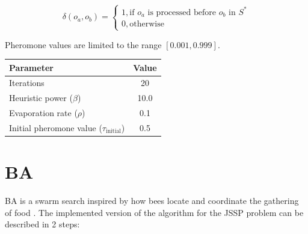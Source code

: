 \documentclass[paper=a4, fontsize=9pt]{scrartcl}
\begin{document}
\begin{multicols}{2}
\begin{equation}
\delta(o_a, o_b) =
\begin{cases}
1, \text{if $o_a$ is processed before $o_b$ in $S^{*}$}\\
0, \text{otherwise}
\end{cases}
\label{eq:acodelta}
\end{equation}

Pheromone values are limited to the range $[0.001, 0.999]$.

{
\vspace{0.2cm}
\begin{minipage}{\linewidth{}}
\centering
\begin{tabular}{lc}
\toprule
Parameter                                         & Value \\
\midrule
Iterations                                        & 20    \\
Heuristic power ($\beta$)                         & 10.0  \\
Evaporation rate ($\rho$)                         &  0.1  \\
Initial pheromone value ($\tau_{\text{initial}}$) &  0.5  \\
\bottomrule
\end{tabular}
\vspace{-0.2cm}
\label{table:acoparams}
\end{minipage}
}

\section*{\acl{BA}}

\acf{BA} is a swarm search inspired by how bees locate and coordinate the gathering of food \cite{pham2011bees}. The implemented version of the algorithm for the \ac{JSSP} problem can be described in 2 steps:


\end{multicols}
\end{document}
